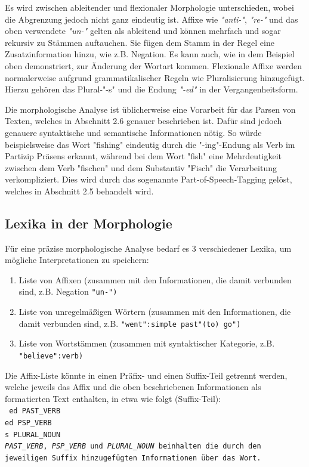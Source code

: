 \documentclass[12pt]{report}
\begin{document}
Es wird zwischen ableitender und flexionaler Morphologie unterschieden, wobei die Abgrenzung jedoch nicht ganz eindeutig ist. Affixe wie \textit{"anti-"}, \textit{"re-"} und das oben verwendete \textit{"un-"} gelten als ableitend und können mehrfach und sogar rekursiv zu Stämmen auftauchen. Sie fügen dem Stamm in der Regel eine Zusatzinformation hinzu, wie z.B. Negation. Es kann auch, wie in dem Beispiel oben demonstriert, zur Änderung der Wortart kommen. Flexionale Affixe werden normalerweise aufgrund grammatikalischer Regeln wie Pluralisierung hinzugefügt. Hierzu gehören das Plural-"-s" und die Endung \textit{"-ed"} in der Vergangenheitsform. 

Die morphologische Analyse ist üblicherweise eine Vorarbeit für das Parsen von Texten, welches in Abschnitt 2.6 genauer beschrieben ist. Dafür sind jedoch genauere syntaktische und semantische Informationen nötig. So würde beispielsweise das Wort "fishing" eindeutig durch die "-ing"-Endung als Verb im Partizip Präsens erkannt, während bei dem Wort "fish" eine Mehrdeutigkeit zwischen dem Verb "fischen" und dem Substantiv "Fisch" die Verarbeitung verkompliziert. Dies wird durch das sogenannte Part-of-Speech-Tagging gelöst, welches in Abschnitt 2.5 behandelt wird.

\subsection{Lexika in der Morphologie}
Für eine präzise morphologische Analyse bedarf es 3 verschiedener Lexika, um mögliche Interpretationen zu speichern:

\begin{enumerate}
\item Liste von Affixen (zusammen mit den Informationen, die damit verbunden sind, z.B. Negation \tt "un-"\rm)
\item Liste von unregelmäßigen Wörtern (zusammen mit den Informationen, die damit verbunden sind, z.B. \tt "went":simple past"(to) go"\rm)
\item Liste von Wortstämmen (zusammen mit syntaktischer Kategorie, z.B. \tt "believe":verb\rm)
\end{enumerate}

Die Affix-Liste könnte in einen Präfix- und einen Suffix-Teil getrennt werden, welche jeweils das Affix und die oben beschriebenen Informationen als formatierten Text enthalten, in etwa wie folgt (Suffix-Teil):
\\
\tt
ed PAST\_VERB\\
ed PSP\_VERB\\
s PLURAL\_NOUN\\
\rm
\textit{PAST\_VERB}, \textit{PSP\_VERB} und \textit{PLURAL\_NOUN} beinhalten die durch den jeweiligen Suffix hinzugefügten Informationen über das Wort. 
\end{document}
